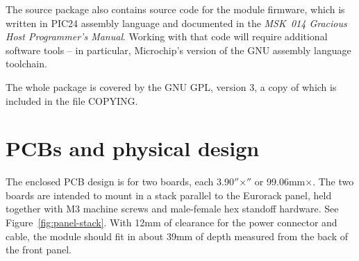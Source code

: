 The source package also contains source code for the module firmware, which
is written in PIC24 assembly language and documented in the \emph{MSK~014
Gracious Host Programmer's Manual}.  Working with that code will require
additional software tools -- in particular, Microchip's version of the GNU
assembly language toolchain.

The whole package is covered by the GNU GPL, version 3, a copy of which is
included in the file COPYING.

\section{PCBs and physical design}

The enclosed PCB design is for two boards, each
3.90$''$\linebreak[0]$\times$$''$ or
99.06mm\linebreak[0]$\times$\linebreak[0]38.10mm.
The two boards are intended to
mount in a stack parallel to the Eurorack panel, held together with M3
machine screws and male-female hex standoff hardware.  See
Figure~\ref{fig:panel-stack}.  With 12mm of clearance for the power
connector and cable, the module should fit in about 39mm of depth measured from the
back of the front panel.

